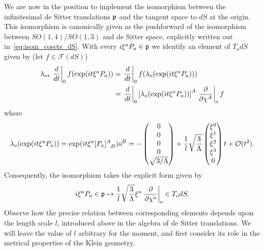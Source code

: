 \documentclass[
final,
11pt,
a4paper,
DIV=11,
headinclude=true,
footinclude=false,
bibliography=totoc,
twoside=true,  %
BCOR=5mm
]{scrbook}
\begin{document}
We are now in the position to implement the isomorphism between 
the infinitesimal de Sitter translations $\mathfrak{p}$ and the tangent 
space to $dS$ at the origin. This isomorphism is canonically 
given as the pushforward of the isomorphism between 
$SO(1,4)/SO(1,3)$ and de Sitter space, explicitly written out 
in~\eqref{eq:isom_cosets_dS}. With every $i\xi^a P_a \in \mathfrak{p}$ 
we identify an element of $T_o dS$ given by (let $f \in 
\mathscr{F}(dS)$)
\begin{align*}
  \lambda_{o*} \left.\frac{d}{dt}\right|_0 f( \exp(it\xi^a P_a))
  &= \left.\frac{d}{dt}\right|_0 f( \lambda_o(\exp(it\xi^a P_a)))
  \\
  &= \left.\frac{d}{dt}\right|_0 {[ \lambda_o(\exp(it\xi^a 
    P_a))]}^A \left.\frac{\partial}{\partial \chi^A}\right|_o f
\end{align*}
where
\begin{equation*}
  \lambda_o(\exp(it\xi^a P_a))
  = \exp(it \xi^a [P_a]\ind{^A_B})o^B = -
  \begin{pmatrix}
    0 \\ 0 \\ 0 \\ 0 \\ \sqrt{3/\Lambda}
  \end{pmatrix}
  + \frac{1}{l} \sqrt{\frac{3}{\Lambda}}
  \begin{pmatrix}
    \xi^0 \\ \xi^1 \\ \xi^2 \\ \xi^3 \\ 0
  \end{pmatrix}
  t
  + \mc{O}(t^2).
\end{equation*}
Consequently, the isomorphism takes the explicit form given by
\begin{equation}
\label{eq:isom_mf(p)_TdS}
  i\xi^a P_a \in \mathfrak{p} \mapsto
  \frac{1}{l} \sqrt{\frac{3}{\Lambda}} \xi^a \left.\frac{\partial}{\partial 
      \chi^a}\right|_o \in T_o dS.
\end{equation}
Observe how the precise relation between corresponding elements 
depends upon the length scale $l$, introduced above in the 
algebra of de Sitter translations. We will leave the value of $l$ 
arbitrary for the moment, and first consider its role in the 
metrical properties of the Klein geometry.
\end{document}
